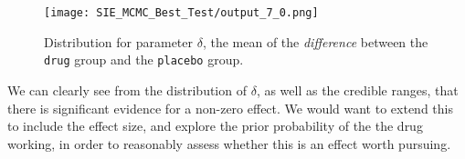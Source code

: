 \begin{Shaded}
\begin{Highlighting}[]
\NormalTok{)}
\end{Highlighting}
\end{Shaded}

\begin{figure}[htbp]
\centering
\texttt{[image: SIE\_MCMC\_Best\_Test/output\_7\_0.png]}
\caption{Distribution for parameter $\delta$, the mean of the {\em difference} between the {\tt drug} group and the {\tt placebo} group.}
\end{figure}

We can clearly see from the distribution of $\delta$, as well as the credible ranges, that there is significant evidence for a non-zero effect.  We would want to extend this to include the effect size, and explore the prior probability of the the drug working, in order to reasonably assess whether this is an effect worth pursuing.  
